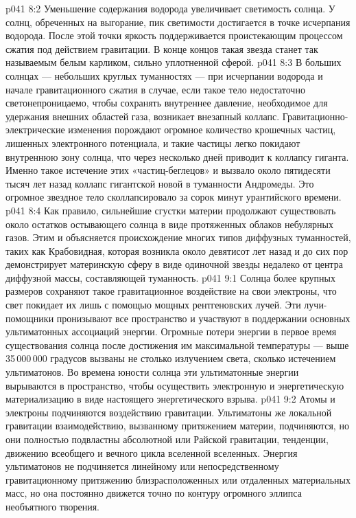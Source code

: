 \vs p041 8:2 \pc Уменьшение содержания водорода увеличивает светимость солнца. У солнц, обреченных на выгорание, пик светимости достигается в точке исчерпания водорода. После этой точки яркость поддерживается проистекающим процессом сжатия под действием гравитации. В конце концов такая звезда станет так называемым белым карликом, сильно уплотненной сферой.
\vs p041 8:3 \pc В больших солнцах --- небольших круглых туманностях --- при исчерпании водорода и начале гравитационного сжатия в случае, если такое тело недостаточно светонепроницаемо, чтобы сохранять внутреннее давление, необходимое для удержания внешних областей газа, возникает внезапный коллапс. Гравитационно\hyp{}электрические изменения порождают огромное количество крошечных частиц, лишенных электронного потенциала, и такие частицы легко покидают внутреннюю зону солнца, что через несколько дней приводит к коллапсу гиганта. Именно такое истечение этих «частиц\hyp{}беглецов» и вызвало около пятидесяти тысяч лет назад коллапс гигантской новой в туманности Андромеды. Это огромное звездное тело сколлапсировало за сорок минут урантийского времени.
\vs p041 8:4 Как правило, сильнейшие сгустки материи продолжают существовать около остатков остывающего солнца в виде протяженных облаков небулярных газов. Этим и объясняется происхождение многих типов диффузных туманностей, таких как Крабовидная, которая возникла около девятисот лет назад и до сих пор демонстрирует материнскую сферу в виде одиночной звезды недалеко от центра диффузной массы, составляющей туманность.
\vs p041 9:1 Солнца более крупных размеров сохраняют такое гравитационное воздействие на свои электроны, что свет покидает их лишь с помощью мощных рентгеновских лучей. Эти лучи\hyp{}помощники пронизывают все пространство и участвуют в поддержании основных ультиматонных ассоциаций энергии. Огромные потери энергии в первое время существования солнца после достижения им максимальной температуры --- выше 35\,000\,000 градусов вызваны не столько излучением света, сколько истечением ультиматонов. Во времена юности солнца эти ультиматонные энергии вырываются в пространство, чтобы осуществить электронную и энергетическую материализацию в виде настоящего энергетического взрыва.
\vs p041 9:2 \pc Атомы и электроны подчиняются воздействию гравитации. Ультиматоны же локальной гравитации взаимодействию, вызванному притяжением материи,  подчиняются, но они полностью подвластны абсолютной или Райской гравитации, тенденции, движению всеобщего и вечного цикла вселенной вселенных. Энергия ультиматонов не подчиняется линейному или непосредственному гравитационному притяжению близрасположенных или отдаленных материальных масс, но она постоянно движется точно по контуру огромного эллипса необъятного творения.
